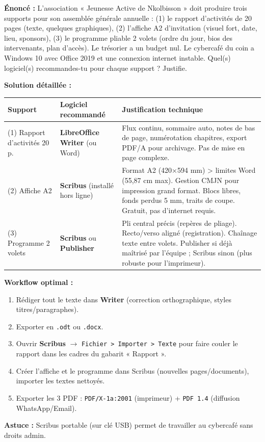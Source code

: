 \documentclass[11pt]{article}
\begin{document}
\begin{exoresolu}
\textbf{Énoncé :} L'association « Jeunesse Active de Nkolbisson » doit produire trois supports pour son assemblée générale annuelle : (1) le rapport d'activités de 20 pages (texte, quelques graphiques), (2) l'affiche A2 d'invitation (visuel fort, date, lieu, sponsors), (3) le programme pliable 2 volets (ordre du jour, bios des intervenants, plan d'accès). Le trésorier a un budget nul. Le cybercafé du coin a Windows 10 avec Office 2019 et une connexion internet instable. Quel(s) logiciel(s) recommandes-tu pour chaque support ? Justifie.

\tcblower
\textbf{Solution détaillée :}

\begin{center}
\begin{tabularx}{\linewidth}{|l|X|X|}
\hline
\rowcolor{popblueL}
\textbf{Support} & \textbf{Logiciel recommandé} & \textbf{Justification technique} \\
\hline
(1) Rapport d'activités 20 p. & \textbf{LibreOffice Writer} (ou Word) & Flux continu, sommaire auto, notes de bas de page, numérotation chapitres, export PDF/A pour archivage. Pas de mise en page complexe. \\
\hline
(2) Affiche A2 & \textbf{Scribus} (installé hors ligne) & Format A2 (420×594 mm) > limites Word (55,87 cm max). Gestion CMJN pour impression grand format. Blocs libres, fonds perdus 5 mm, traits de coupe. Gratuit, pas d'internet requis. \\
\hline
(3) Programme 2 volets & \textbf{Scribus} ou \textbf{Publisher} & Pli central précis (repères de pliage). Recto/verso aligné (registration). Chaînage texte entre volets. Publisher si déjà maîtrisé par l'équipe ; Scribus sinon (plus robuste pour l'imprimeur). \\
\hline
\end{tabularx}
\end{center}

\textbf{Workflow optimal :}
\begin{enumerate}
    \item Rédiger tout le texte dans \textbf{Writer} (correction orthographique, styles titres/paragraphes).
    \item Exporter en \texttt{.odt} ou \texttt{.docx}.
    \item Ouvrir \textbf{Scribus} $\rightarrow$ \texttt{Fichier > Importer > Texte} pour faire couler le rapport dans les cadres du gabarit « Rapport ».
    \item Créer l'affiche et le programme dans Scribus (nouvelles pages/documents), importer les textes nettoyés.
    \item Exporter les 3 PDF : \texttt{PDF/X-1a:2001} (imprimeur) + \texttt{PDF 1.4} (diffusion WhatsApp/Email).
\end{enumerate}
\textbf{Astuce :} Scribus portable (sur clé USB) permet de travailler au cybercafé sans droits admin.
\end{exoresolu}
\end{document}
